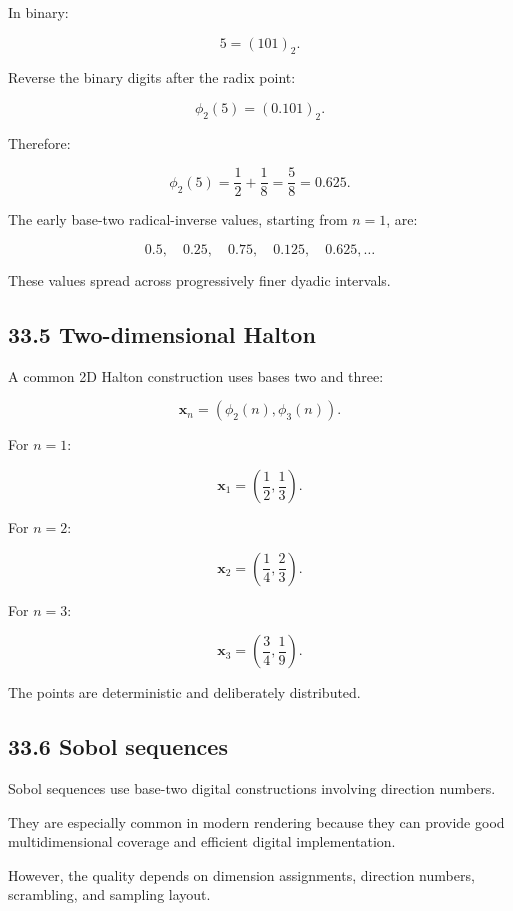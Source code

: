 In binary:

\[ 5=(101)_2. \]

Reverse the binary digits after the radix point:

\[ \phi_2(5)=(0.101)_2. \]

Therefore:

\[ \boxed{ \phi_2(5)=\frac12+\frac18=\frac58=0.625 }. \]

The early base-two radical-inverse values, starting from \(n=1\), are:

\[ 0.5,\quad0.25,\quad0.75,\quad0.125,\quad0.625,\ldots \]

These values spread across progressively finer dyadic intervals.

\subsection{33.5 Two-dimensional Halton}\label{02-foundations-ii-ch031-two-dimensional-halton}

\hypertarget{02-foundations-ii-ch031-two-dimensional-halton}{}

A common 2D Halton construction uses bases two and three:

\[ \boxed{ \mathbf x_n= (\phi_2(n),\phi_3(n)) }. \]

For \(n=1\):

\[ \boxed{ \mathbf x_1= \left(\frac12,\frac13\right) }. \]

For \(n=2\):

\[ \boxed{ \mathbf x_2= \left(\frac14,\frac23\right) }. \]

For \(n=3\):

\[ \boxed{ \mathbf x_3= \left(\frac34,\frac19\right) }. \]

The points are deterministic and deliberately distributed.

\subsection{33.6 Sobol sequences}\label{02-foundations-ii-ch031-sobol-sequences}

\hypertarget{02-foundations-ii-ch031-sobol-sequences}{}

Sobol sequences use base-two digital constructions involving direction numbers.

They are especially common in modern rendering because they can provide good multidimensional coverage and efficient digital implementation.

However, the quality depends on dimension assignments, direction numbers, scrambling, and sampling layout.

